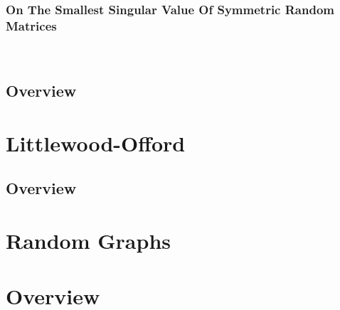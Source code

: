\documentclass[12pt]{article}
\begin{document}
 

\subsubsection{On The Smallest Singular Value Of Symmetric Random Matrices}

\\\newline

\subsection{Overview}

\newpage
\section{Littlewood-Offord}


\subsection{Overview}

\section{Random Graphs}









\section{Overview}

\newpage
\printbibliography
\end{document}
